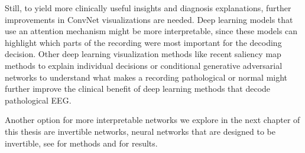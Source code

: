 Still, to yield more clinically useful insights and diagnosis
explanations, further improvements in ConvNet visualizations are needed.
Deep learning models that use an attention mechanism might be more
interpretable, since these models can highlight which parts of the
recording were most important for the decoding decision. Other deep
learning visualization methods like recent saliency map methods
\cite{kindermans_patternnet_2017,montavon_methods_2017}
to explain individual decisions or conditional generative adversarial
networks
\cite{mirza_conditional_2014,springenberg_unsupervised_2015}
to understand what makes a recording pathological or normal might
further improve the clinical benefit of deep learning methods that
decode pathological EEG.

Another option for more interpretable networks we explore in the next
chapter of this thesis are invertible networks, neural networks that are
designed to be invertible, see  for
methods and  for results.

    
